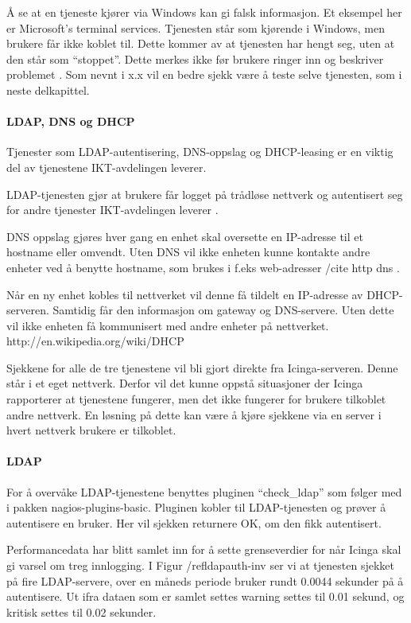 Å se at en tjeneste kjører via Windows kan gi falsk informasjon. Et eksempel her er Microsoft's terminal services. Tjenesten står som kjørende i Windows, men brukere får ikke koblet til. Dette kommer av at tjenesten har hengt seg, uten at den står som “stoppet”. Dette merkes ikke før brukere ringer inn og beskriver problemet \cite{serviceproblem}. Som nevnt i x.x vil en bedre sjekk være å teste selve tjenesten, som i neste delkapittel.

\paragraph{LDAP, DNS og DHCP}

Tjenester som LDAP-autentisering, DNS-oppslag og DHCP-leasing er en viktig del av tjenestene IKT-avdelingen leverer.

LDAP-tjenesten gjør at brukere får logget på trådløse nettverk og autentisert seg for andre tjenester IKT-avdelingen leverer \cite{ldap}.

DNS oppslag gjøres hver gang en enhet skal oversette en IP-adresse til et hostname eller omvendt. Uten DNS vil ikke enheten kunne kontakte andre enheter ved å benytte hostname, som brukes i f.eks web-adresser /cite http dns . 

Når en ny enhet kobles til nettverket vil denne få tildelt en IP-adresse av DHCP-serveren. Samtidig får den informasjon om gateway og DNS-servere. Uten dette vil ikke enheten få kommunisert med andre enheter på nettverket. http://en.wikipedia.org/wiki/DHCP

Sjekkene for alle de tre tjenestene vil bli gjort direkte fra Icinga-serveren. Denne står i et eget nettverk. Derfor vil det kunne oppstå situasjoner der Icinga rapporterer at tjenestene fungerer, men det ikke fungerer for brukere tilkoblet andre nettverk. En løsning på dette kan være å kjøre sjekkene via en server i hvert nettverk brukere er tilkoblet.


\paragraph{LDAP}

For å overvåke LDAP-tjenestene benyttes pluginen “check\_ldap” som følger med i pakken nagios-plugins-basic. Pluginen kobler til LDAP-tjenesten og prøver å autentisere en bruker. Her vil sjekken returnere OK, om den fikk autentisert. 

Performancedata har blitt samlet inn for å sette grenseverdier for når Icinga skal gi varsel om treg innlogging. I Figur /ref{ldapauth-inv} ser vi at tjenesten sjekket på fire LDAP-servere, over en måneds periode bruker rundt 0.0044 sekunder på å autentisere. Ut ifra dataen som er samlet settes warning settes til 0.01 sekund, og kritisk settes til 0.02 sekunder.

